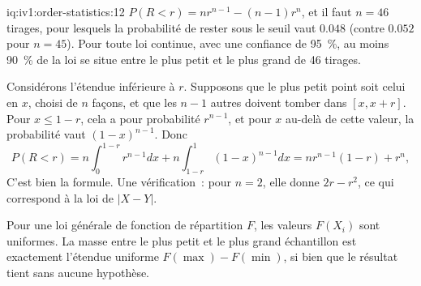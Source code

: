 \begin{solution}{iq:iv1:order-statistics:12}
$P(R < r) = n r^{n - 1} - (n - 1) r^n$, et il faut $n = 46$ tirages, pour lesquels la probabilité de rester sous le seuil vaut $0.048$ (contre $0.052$ pour $n = 45$). Pour toute loi continue, avec une confiance de 95~\%, au moins 90~\% de la loi se situe entre le plus petit et le plus grand de 46 tirages.

Considérons l'étendue inférieure à $r$. Supposons que le plus petit point soit celui en $x$, choisi de $n$ façons, et que les $n - 1$ autres doivent tomber dans $[x, x + r]$. Pour $x \le 1 - r$, cela a pour probabilité $r^{n - 1}$, et pour $x$ au-delà de cette valeur, la probabilité vaut $(1 - x)^{n - 1}$. Donc
\[
P(R < r) = n\int_0^{1 - r} r^{n - 1}dx + n\int_{1 - r}^1 (1 - x)^{n - 1} dx = n r^{n - 1}(1 - r) + r^n,
\]
C'est bien la formule. Une vérification~: pour $n = 2$, elle donne $2r - r^2$, ce qui correspond à la loi de $|X - Y|$.

Pour une loi générale de fonction de répartition $F$, les valeurs $F(X_i)$ sont uniformes. La masse entre le plus petit et le plus grand échantillon est exactement l'étendue uniforme $F(\max) - F(\min)$, si bien que le résultat tient sans aucune hypothèse.

\end{solution}


